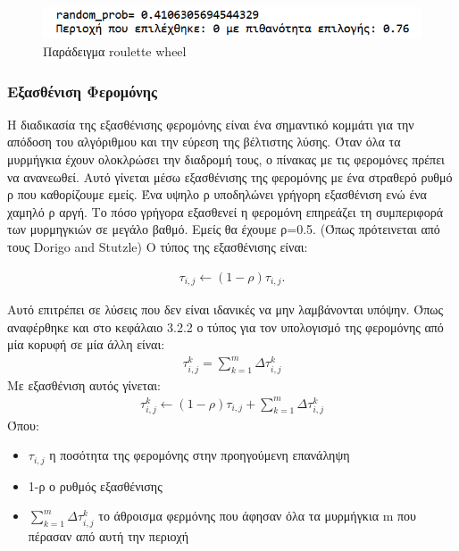 \begin{figure}
    \centering
    \includegraphics[scale=1]{2947_thesis/pictures/roulette_wheel_example.png} 
    \caption{Παράδειγμα roulette wheel}
    \label{roulette}
\end{figure}


\subsubsection{Εξασθένιση Φερομόνης}

Η διαδικασία της εξασθένισης φερομόνης είναι ένα σημαντικό κομμάτι για την απόδοση του αλγόριθμου και την εύρεση της βέλτιστης λύσης. Όταν όλα τα μυρμήγκια έχουν ολοκλρώσει την διαδρομή τους, ο πίνακας με τις φερομόνες πρέπει να ανανεωθεί. Αυτό γίνεται μέσω εξασθένισης της φερομόνης με ένα στραθερό ρυθμό ρ που καθορίζουμε εμείς. Ένα υψηλο ρ υποδηλώνει γρήγορη εξασθένιση ενώ ένα χαμηλό ρ αργή. Το πόσο γρήγορα εξασθενεί η φερομόνη επηρεάζει τη συμπεριφορά των μυρμηγκιών σε μεγάλο βαθμό. \cite{dawson2013improving} Εμείς θα έχουμε ρ=0.5. (Όπως πρότεινεται από τους Dorigo and Stutzle) \cite{dorigo2003ant} Ο τύπος της εξασθένισης είναι: 

\begin{align}
	τ_{i,j}\leftarrow(1-ρ)τ_{i,j}.
\end{align}

Αυτό επιτρέπει σε λύσεις που δεν είναι ιδανικές να μην λαμβάνονται υπόψην. Όπως αναφέρθηκε και στο κεφάλαιο 3.2.2 ο τύπος για τον υπολογισμό της φερομόνης από μία κορυφή σε μία άλλη είναι: 
\begin{align}
    τ_{i,j}^k=\sum_{k=1}^{m}{Δτ^k_{i,j}}
\end{align}
Με εξασθένιση αυτός γίνεται: 
\begin{align}
    τ_{i,j}^k\leftarrow(1-ρ)τ_{i,j}+\sum_{k=1}^{m}{Δτ^k_{i,j}}
\end{align}
Όπου: 
\begin{itemize}
    \item $τ_{i,j}$ η ποσότητα της φερομόνης στην προηγούμενη επανάληψη
    \item 1-ρ ο ρυθμός εξασθένισης
    \item $\sum_{k=1}^{m}{Δτ^k_{i,j}}$ το άθροισμα φερμόνης που άφησαν όλα τα μυρμήγκια m που πέρασαν από αυτή την περιοχή
\end{itemize}


